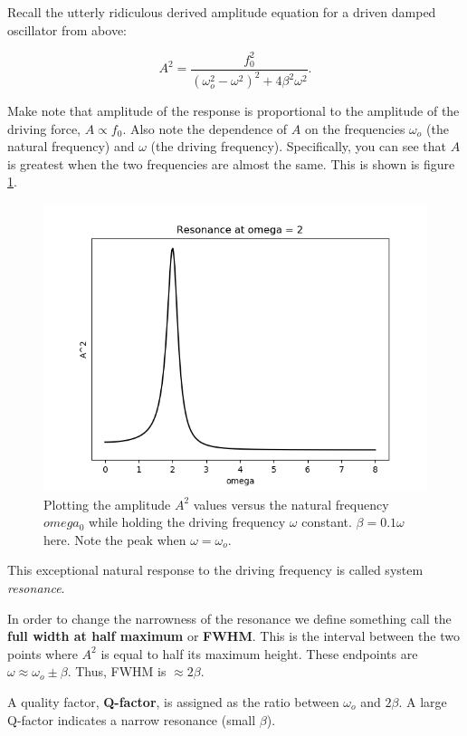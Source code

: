 
Recall the utterly ridiculous derived amplitude equation for a driven damped oscillator from above:

\begin{equation*}
    A^2 = \frac{f_0^2}{(\omega_o^2 - \omega^2)^2 + 4\beta^2\omega^2}.
\end{equation*}

\noindent Make note that amplitude of the response is proportional to the amplitude of the driving force, $A \propto f_0$. Also note the dependence of $A$ on the frequencies $\omega_o$ (the natural frequency) and $\omega$ (the driving frequency). Specifically, you can see that $A$ is greatest when the two frequencies are almost the same. This is shown is figure \ref{fig:resonance_plot}.

\begin{figure}[h]
    \centering
    \includegraphics[width=12cm]{Classical_Mechanics/2.13-resonance/A_vs_w_resonance.png}
    \caption{Plotting the amplitude $A^2$ values versus the natural frequency $omega_0$ while holding the driving frequency $\omega$ constant. $\beta = 0.1\omega$ here. Note the peak when $\omega = \omega_o$.}
    \label{fig:resonance_plot}
\end{figure}

This exceptional natural response to the driving frequency is called system {\itshape resonance}.

In order to change the narrowness of the resonance we define something call the {\bfseries full width at half maximum} or {\bfseries FWHM}. This is the interval between the two points where $A^2$ is equal to half its maximum height. These endpoints are $\omega \approx \omega_o \pm \beta$. Thus, FWHM is $\approx 2\beta$.

A quality factor, {\bfseries Q-factor}, is assigned as the ratio between $\omega_o$ and $2\beta$. A large Q-factor indicates a narrow resonance (small $\beta$).
